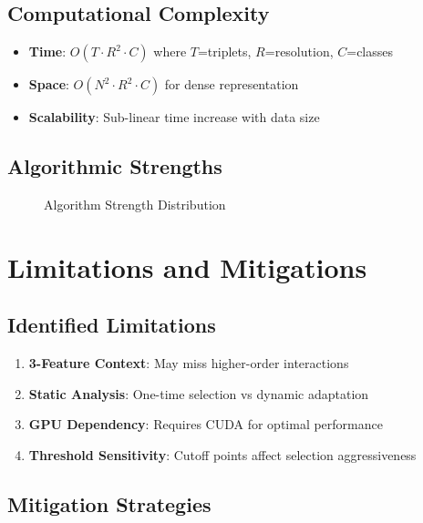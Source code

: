 \documentclass[11pt,a4paper]{article}
\begin{document}
\subsection{Computational Complexity}

\begin{itemize}
\item \textbf{Time}: $O(T \cdot R^2 \cdot C)$ where $T$=triplets, $R$=resolution, $C$=classes
\item \textbf{Space}: $O(N^2 \cdot R^2 \cdot C)$ for dense representation
\item \textbf{Scalability}: Sub-linear time increase with data size
\end{itemize}

\subsection{Algorithmic Strengths}

\begin{figure}[h!]
\centering
{}
\caption{Algorithm Strength Distribution}
\label{fig:strengths}
\end{figure}

\section{Limitations and Mitigations}

\subsection{Identified Limitations}

\begin{enumerate}
\item \textbf{3-Feature Context}: May miss higher-order interactions
\item \textbf{Static Analysis}: One-time selection vs dynamic adaptation
\item \textbf{GPU Dependency}: Requires CUDA for optimal performance
\item \textbf{Threshold Sensitivity}: Cutoff points affect selection aggressiveness
\end{enumerate}

\subsection{Mitigation Strategies}
\end{document}
